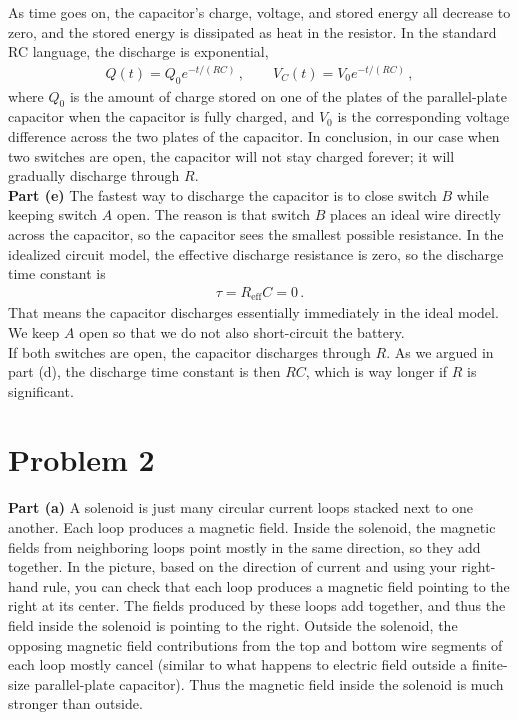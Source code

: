\documentclass[11pt]{article}
\begin{document}
As time goes on, the capacitor's charge, voltage, and stored energy all decrease to zero, and the stored energy is dissipated as heat in the resistor. In the standard RC language, the discharge is exponential,
\begin{align*}
Q(t) = Q_0 e^{-t/(RC)}\,,\qquad
V_C(t) = V_0 e^{-t/(RC)}\,,
\end{align*}
where $Q_0$ is the amount of charge stored on one of the plates of the parallel-plate capacitor when the capacitor is fully charged, and $V_0$ is the corresponding voltage difference across the two plates of the capacitor. In conclusion, in our case when two switches are open, the capacitor will not stay charged forever; it will gradually discharge through $R$.\\

\noindent\textbf{Part (e)} The fastest way to discharge the capacitor is to close switch $B$ while keeping switch $A$ open. The reason is that switch $B$ places an ideal wire directly across the capacitor, so the capacitor sees the smallest possible resistance. In the idealized circuit model, the effective discharge resistance is zero, so the discharge time constant is
\begin{align*}
\tau = R_{\text{eff}}C = 0\,.
\end{align*}
That means the capacitor discharges essentially immediately in the ideal model. We keep $A$ open so that we do not also short-circuit the battery.\\

If both switches are open, the capacitor discharges through $R$. As we argued in part (d), the discharge time constant is then $RC$, which is way longer if $R$ is significant. 

\section*{Problem 2}

\noindent\textbf{Part (a)} A solenoid is just many circular current loops stacked next to one another. Each loop produces a magnetic field. Inside the solenoid, the magnetic fields from neighboring loops point mostly in the same direction, so they add together. In the picture, based on the direction of current and using your right-hand rule, you can check that each loop produces a magnetic field pointing to the right at its center. The fields produced by these loops add together, and thus the field inside the solenoid is pointing to the right.  Outside the solenoid, the opposing magnetic field contributions from the top and bottom wire segments of each loop mostly cancel (similar to what happens to electric field outside a finite-size parallel-plate capacitor). Thus the magnetic field inside the solenoid is much stronger than outside.\\
\end{document}
